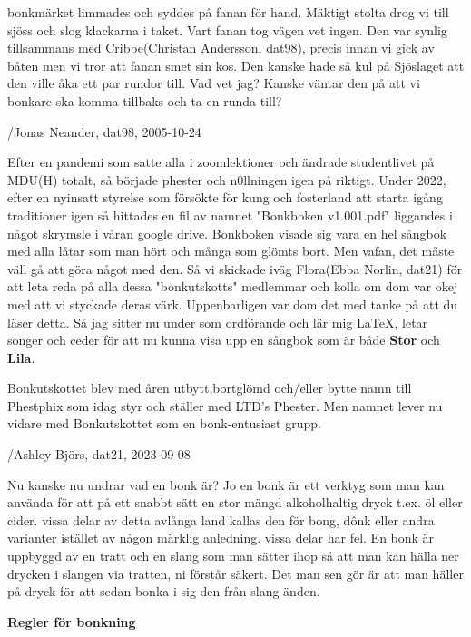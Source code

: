 bonkmärket limmades och syddes på fanan för hand. Mäktigt stolta drog vi till sjöss och slog klackarna i taket. Vart fanan tog vägen vet ingen. Den var synlig tillsammans med Cribbe(Christan Andersson, dat98), precis innan vi gick av båten men vi tror att fanan smet sin kos. Den kanske hade så kul på Sjöslaget att den ville åka ett par rundor till. Vad vet jag? Kanske väntar den på att vi bonkare ska komma tillbaks och ta en runda till? 

/Jonas Neander, dat98, 2005-10-24

Efter en pandemi som satte alla i zoomlektioner och ändrade studentlivet på MDU(H) totalt, så började phester och n0llningen igen på riktigt. Under 2022, efter en nyinsatt styrelse som försökte för kung och fosterland att starta igång traditioner igen så hittades en fil av namnet "Bonkboken v1.001.pdf" liggandes i något skrymsle i våran google drive. Bonkboken visade sig vara en hel sångbok med alla låtar som man hört och många som glömts bort. Men vafan, det måste väll gå att göra något med den. Så vi skickade iväg Flora(Ebba Norlin, dat21) för att leta reda på alla dessa "bonkutskotts" medlemmar och kolla om dom var okej med att vi styckade deras värk. Uppenbarligen var dom det med tanke på att du läser detta. Så jag sitter nu under som ordförande och lär mig LaTeX, letar songer och ceder för att nu kunna visa upp en sångbok som är både \textbf{Stor} och \textbf{Lila}. 

Bonkutskottet blev med åren utbytt,bortglömd och/eller bytte namn till Phestphix som idag styr och ställer med LTD's Phester. Men namnet lever nu vidare med Bonkutskottet som en bonk-entusiast grupp.

/Ashley Björs, dat21, 2023-09-08\newpage


Nu kanske nu undrar vad en bonk är? Jo en bonk är ett verktyg som man kan använda för att på ett snabbt sätt en stor mängd alkoholhaltig dryck t.ex. öl eller cider. vissa delar av detta avlånga land kallas den för bong, dônk eller andra varianter istället av någon märklig anledning. vissa delar har fel. En bonk är uppbyggd av en tratt och en slang som man sätter ihop så att man kan hälla ner drycken i slangen via tratten, ni förstår säkert. Det man sen gör är att man häller på dryck för att sedan bonka i sig den från slang änden. 

\textbf{Regler för bonkning}


